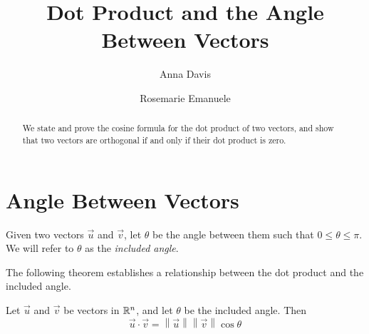 \documentclass{ximera}
\author{Anna Davis \and Rosemarie Emanuele} \title{Dot Product and the Angle Between Vectors} \license{CC-BY 4.0}
\newcommand\norm[1]{\left\lVert#1\right\rVert}
\begin{document}
\begin{abstract}
 We state and prove the cosine formula for the dot product of two vectors, and show that two vectors are orthogonal if and only if their dot product is zero.
\end{abstract}
\maketitle


\section*{Angle Between Vectors} 
Given two vectors $\vec{u}$ and $\vec{v}$, let $\theta$ be the angle between them such that $0\leq\theta\leq \pi$.  We will refer to $\theta$ as the {\it included angle}.

\begin{image}[2in]
\end{image}

The following theorem establishes a relationship between the dot product and the included angle.

  \begin{theorem}\label{th:dotproductcosine} Let $\vec{u}$ and $\vec{v}$ be vectors in $\mathbb{R}^n$, and let $\theta$ be the included angle.  Then
  \begin{equation*} \label{matlintrans}
 \vec{u}\cdot\vec{v}=\norm{\vec{u}}\norm{\vec{v}}\cos \theta
\end{equation*}
\end{theorem}
\end{document}
